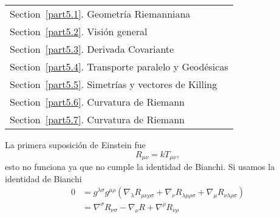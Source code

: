 \documentclass[../main]{subfiles}
\begin{document}
        \begin{margintable}\vspace{1.3in}\footnotesize
		\begin{tabularx}{\marginparwidth}{|X}
		  Section~\ref{part5.1}. Geometría Riemanniana\\
            Section~\ref{part5.2}. Visión general \\
            Section~\ref{part5.3}. Derivada Covariante\\
            Section~\ref{part5.4}. Transporte paralelo y Geodésicas\\
            Section~\ref{part5.5}. Simetrías y vectores de Killing\\
            Section~\ref{part5.6}. Curvatura de Riemann\\
            Section~\ref{part5.7}. Curvatura de Riemann\\
		\end{tabularx}
	\end{margintable}
 
La primera suposición de Einstein fue 
\begin{equation}
    R_{\mu\nu}=kT_{\mu\nu},
\end{equation}
esto no funciona ya que no cumple la identidad de Bianchi. Si usamos la identidad de Bianchi 
\begin{equation}
    \begin{split}
        0&=g^{\lambda\sigma}g^{\mu\rho}(\nabla_{\lambda}R_{\mu\nu\rho\sigma}+\nabla_{\nu}R_{\lambda\mu\rho\sigma}+\nabla_{\mu}R_{\nu\lambda\rho\sigma})\\
        &=\nabla^{\sigma} R_{\nu\sigma}-\nabla_{\nu} R +\nabla^{\rho}R_{\nu\rho}
    \end{split}
\end{equation}
\end{document}
